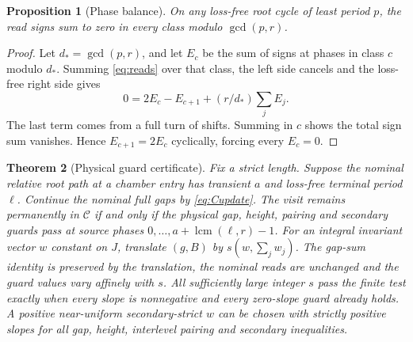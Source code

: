\documentclass[11pt]{amsart}
\newtheorem{theorem}{Theorem}
\newtheorem{proposition}[theorem]{Proposition}
\theoremstyle{definition}
\DeclareMathOperator{\lcm}{lcm}
\newcommand{\C}{\mathcal C}
\begin{document}
\begin{proposition}[Phase balance]\label{prop:balance}
On any loss-free root cycle of least period \(p\), the read
signs sum to zero in every class modulo \(\gcd(p,r)\).
\end{proposition}
\begin{proof}
Let \(d_*=\gcd(p,r)\), and let \(E_c\) be the sum of signs
at phases in class \(c\) modulo \(d_*\). Summing
\eqref{eq:reads} over that class, the left side cancels and
the loss-free right side gives
\[
 0=2E_c-E_{c+1}+(r/d_*)\sum_j E_j .
\]
The last term comes from a full turn of shifts. Summing in
\(c\) shows the total sign sum vanishes. Hence
\(E_{c+1}=2E_c\) cyclically, forcing every \(E_c=0\).
\end{proof}

\begin{theorem}[Physical guard certificate]\label{th:guards}
Fix a strict length. Suppose the nominal relative root
path at a chamber entry has transient \(a\) and loss-free
terminal period \(\ell\). Continue the nominal full gaps by
\eqref{eq:Cupdate}. The visit remains permanently in
\(\C\) if and only if the physical gap, height, pairing and
secondary guards pass at source phases
\(0,\ldots,a+\lcm(\ell,r)-1\).
For an integral invariant vector \(w\) constant on \(J\),
translate \((g,B)\) by \(s(w,\sum_j w_j)\).
The gap-sum identity is preserved by the translation, the nominal
reads are unchanged and the guard values
vary affinely with \(s\). All sufficiently large integer
\(s\) pass the finite test exactly when every slope is
nonnegative and every zero-slope guard already holds.
A positive near-uniform secondary-strict \(w\) can be
chosen with strictly positive slopes for all gap, height,
interlevel pairing and secondary inequalities.
\end{theorem}
\end{document}
